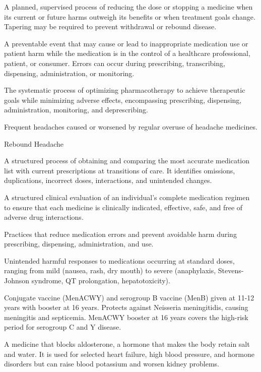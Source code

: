  A planned, supervised process of reducing the dose or stopping a medicine when its
current or future harms outweigh its benefits or when treatment goals change. Tapering
may be required to prevent withdrawal or rebound disease.

 A preventable event that may cause or lead to inappropriate medication use or patient
harm while the medication is in the control of a healthcare professional, patient, or
consumer. Errors can occur during prescribing, transcribing, dispensing, administration,
or monitoring.

 The systematic process of optimizing pharmacotherapy to achieve therapeutic goals while
minimizing adverse effects, encompassing prescribing, dispensing, administration,
monitoring, and deprescribing.

 Frequent headaches caused or worsened by regular overuse of headache medicines.

\synonyms
Rebound Headache

 A structured process of obtaining and comparing the most accurate medication list with
current prescriptions at transitions of care. It identifies omissions, duplications,
incorrect doses, interactions, and unintended changes.

 A structured clinical evaluation of an individual's complete medication regimen to ensure that each medicine is clinically indicated, effective, safe, and free of adverse drug interactions.

 Practices that reduce medication errors and prevent avoidable harm during prescribing, dispensing, administration, and use.

 Unintended harmful responses to medications occurring at standard doses, ranging from
mild (nausea, rash, dry mouth) to severe (anaphylaxis, Stevens-Johnson syndrome, QT
prolongation, hepatotoxicity).

 Conjugate vaccine (MenACWY) and serogroup B vaccine (MenB) given at 11-12 years with
booster at 16 years. Protects against Neisseria meningitidis, causing meningitis and
septicemia. MenACWY booster at 16 years covers the high-risk period for serogroup C and
Y disease.

 A medicine that blocks aldosterone, a hormone that makes the body retain salt and water. It is used for selected heart failure, high blood pressure, and hormone disorders but can raise blood potassium and worsen kidney problems.

